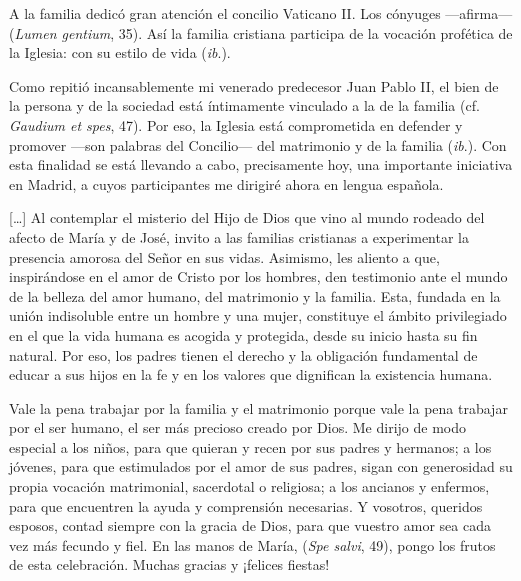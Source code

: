 \begin{body}
\begin{body}
A la familia dedicó gran atención el concilio Vaticano II. Los cónyuges ---afirma---  (\emph{Lumen gentium}, 35). Así la familia cristiana participa de la vocación profética de la Iglesia: con su estilo de vida  (\emph{ib}.).

Como repitió incansablemente mi venerado predecesor Juan Pablo II, el bien de la persona y de la sociedad está íntimamente vinculado a la  de la familia (cf. \emph{Gaudium et spes}, 47). Por eso, la Iglesia está comprometida en defender y promover  ---son palabras del Concilio--- del matrimonio y de la familia (\emph{ib}.). Con esta finalidad se está llevando a cabo, precisamente hoy, una importante iniciativa en Madrid, a cuyos participantes me dirigiré ahora en lengua española.

[\ldots{}] Al contemplar el misterio del Hijo de Dios que vino al mundo rodeado del afecto de María y de José, invito a las familias cristianas a experimentar la presencia amorosa del Señor en sus vidas. Asimismo, les aliento a que, inspirándose en el amor de Cristo por los hombres, den testimonio ante el mundo de la belleza del amor humano, del matrimonio y la familia. Esta, fundada en la unión indisoluble entre un hombre y una mujer, constituye el ámbito privilegiado en el que la vida humana es acogida y protegida, desde su inicio hasta su fin natural. Por eso, los padres tienen el derecho y la obligación fundamental de educar a sus hijos en la fe y en los valores que dignifican la existencia humana.

Vale la pena trabajar por la familia y el matrimonio porque vale la pena trabajar por el ser humano, el ser más precioso creado por Dios. Me dirijo de modo especial a los niños, para que quieran y recen por sus padres y hermanos; a los jóvenes, para que estimulados por el amor de sus padres, sigan con generosidad su propia vocación matrimonial, sacerdotal o religiosa; a los ancianos y enfermos, para que encuentren la ayuda y comprensión necesarias. Y vosotros, queridos esposos, contad siempre con la gracia de Dios, para que vuestro amor sea cada vez más fecundo y fiel. En las manos de María,  (\emph{Spe salvi}, 49), pongo los frutos de esta celebración. Muchas gracias y ¡felices fiestas!


\end{body}
\end{body}
